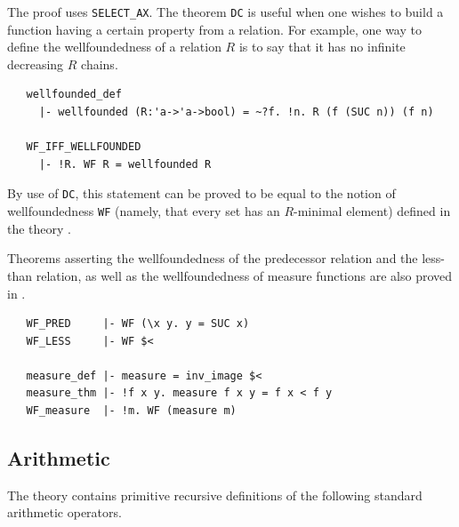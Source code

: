 The proof uses {\small\verb+SELECT_AX+}. The theorem {\small\verb+DC+}
is useful when one wishes to build a function having a certain
property from a relation. For example, one way to define the
wellfoundedness of a relation $R$ is to say that it has no infinite
decreasing $R$ chains.
%
\begin{hol}
\begin{verbatim}
   wellfounded_def
     |- wellfounded (R:'a->'a->bool) = ~?f. !n. R (f (SUC n)) (f n)

   WF_IFF_WELLFOUNDED
     |- !R. WF R = wellfounded R
\end{verbatim}
\end{hol}
By use of {\small\verb+DC+}, this statement can be proved
to be equal to the notion of wellfoundedness {\small\verb+WF+}
(namely, that every set has an $R$-minimal element) defined in the theory
.

Theorems asserting the wellfoundedness of the predecessor relation and
the less-than relation, as well as the wellfoundedness of measure
functions are also proved in .

\begin{hol}
\begin{verbatim}
   WF_PRED     |- WF (\x y. y = SUC x)
   WF_LESS     |- WF $<

   measure_def |- measure = inv_image $<
   measure_thm |- !f x y. measure f x y = f x < f y
   WF_measure  |- !m. WF (measure m)
\end{verbatim}
\end{hol}


\subsection{Arithmetic}

The \HOL{} theory  contains primitive recursive
definitions of the following standard arithmetic operators.

